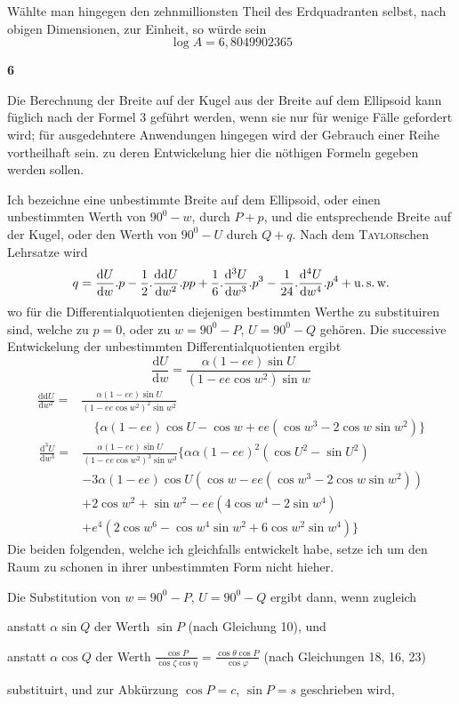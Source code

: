 %
\noindent Wählte man hingegen den zehnmillionsten Theil des Erdquadranten selbst, nach obigen Dimensionen, zur Einheit, so würde sein
\[
\log A=6{,}8049902365
\]
\par\medskip{}\centerline{\textbf{6}}\nobreak\smallskip
\indent Die Berechnung der Breite auf der Kugel aus der Breite auf dem Ellipsoid kann füglich nach der Formel 3 geführt werden, wenn sie nur für wenige Fälle gefordert wird; für ausgedehntere Anwendungen hingegen wird der Gebrauch einer Reihe vortheilhaft sein. zu deren Entwickelung hier die nöthigen Formeln gegeben werden sollen.

Ich bezeichne eine unbestimmte Breite auf dem Ellipsoid, oder einen unbestimmten Werth von \(90^0-w\), durch \(P+p\), und die entsprechende Breite auf der Kugel, oder den Werth von \(90^0-U\) durch \(Q+q\). Nach dem \textsc{Taylor}schen Lehrsatze wird
\[
q=\frac{\mathrm{d}U}{\mathrm{d}w}\mathord{.}p-\frac{1}{2}\mathord{.}\frac{\mathrm{dd}U}{\mathrm{d}w^2}\mathord{.}pp+\frac{1}{6}\mathord{.}\frac{\mathrm{d}^3U}{\mathrm{d}w^3}\mathord{.}p^3-\frac{1}{24}\mathord{.}\frac{\mathrm{d}^4U}{\mathrm{d}w^4}\mathord{.}p^4+\text{u.\,s.\,w.}
\]
wo für die Differentialquotienten diejenigen bestimmten Werthe zu substituiren sind, welche zu \(p=0\), oder zu \(w=90^0-P\), \(U=90^0-Q\) gehören. Die successive Entwickelung der unbestimmten Differentialquotienten ergibt
\[
\frac{\mathrm{d}U}{\mathrm{d}w}=\frac{\alpha(1-ee)\sin U}{(1-ee\cos w^2)\sin w}
\]
\[
\begin{aligned}
\frac{\mathrm{dd}U}{\mathrm{d}w^2}={}&\frac{\alpha(1-ee)\sin U}{(1-ee\cos w^2)^2\sin w^2}\\
&\quad\{\alpha(1-ee)\cos U-\cos w+ee(\cos w^3-2\cos w\sin w^2)\}
\end{aligned}
\]
\[
\begin{aligned}
\frac{\mathrm{d}^3U}{\mathrm{d}w^3}={}&\frac{\alpha(1-ee)\sin U}{(1-ee\cos w^2)^3\sin w^3}\{\alpha\alpha(1-ee)^2(\cos U^2-\sin U^2)\\
&-3\alpha(1-ee)\cos U(\cos w-ee(\cos w^3-2\cos w\sin w^2))\\
&+2\cos w^2+\sin w^2-ee(4\cos w^4-2\sin w^4)\\
&+e^4(2\cos w^6-\cos w^4\sin w^2+6\cos w^2\sin w^4)\}
\end{aligned}
\]
Die beiden folgenden, welche ich gleichfalls entwickelt habe, setze ich um den Raum zu schonen in ihrer unbestimmten Form nicht hieher.

Die Substitution von \(w=90^0-P\), \(U=90^0-Q\) ergibt dann, wenn zugleich
\par\noindent anstatt \(\alpha\sin Q\) der Werth \(\sin P\) (nach Gleichung 10), und
\par\noindent anstatt \(\alpha\cos Q\) der Werth \(\frac{\cos P}{\cos\zeta\cos\eta}=\frac{\cos\theta\cos P}{\cos\varphi}\) (nach Gleichungen 18, 16, 23)
\par\noindent substituirt, und zur Abkürzung \(\cos P=c\), \(\sin P=s\) geschrieben wird,
